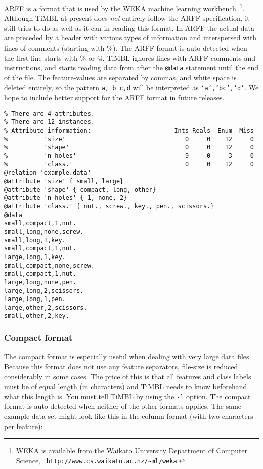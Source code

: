 \documentclass{report}
\begin{document}
ARFF is a format that is used by the WEKA machine learning
workbench~\cite{Garner95,Witten+99}\footnote{WEKA is available from
the Waikato University Department of Computer Science, {\tt
http://www.cs.waikato.ac.nz/\~{}ml/weka}.}.  Although TiMBL at present
does {\em not} entirely follow the ARFF specification, it still tries
to do as well as it can in reading this format. In ARFF the actual
data are preceded by a header with various types of information and
interspersed with lines of comments (starting with \%). The ARFF
format is auto-detected when the first line starts with \% or @. TiMBL
ignores lines with ARFF comments and instructions, and starts reading
data from after the {\tt @data} statement until the end of the
file. The feature-values are separated by commas, and white space is
deleted entirely, so the pattern {\tt a, b c,d} will be interpreted as
{\tt `a',`bc',`d'}. We hope to include better support for the ARFF format
in future releases.

\begin{footnotesize}
\begin{verbatim}
% There are 4 attributes.
% There are 12 instances.
% Attribute information:                       Ints Reals  Enum  Miss
%          'size'                                 0     0    12     0   
%          'shape'                                0     0    12     0   
%          'n_holes'                              9     0     3     0   
%          'class.'                               0     0    12     0   
@relation 'example.data'
@attribute 'size' { small, large}
@attribute 'shape' { compact, long, other}
@attribute 'n_holes' { 1, none, 2}
@attribute 'class.' { nut., screw., key., pen., scissors.}
@data
small,compact,1,nut.
small,long,none,screw.
small,long,1,key.
small,compact,1,nut.
large,long,1,key.
small,compact,none,screw.
small,compact,1,nut.
large,long,none,pen.
large,long,2,scissors.
large,long,1,pen.
large,other,2,scissors.
small,other,2,key.
\end{verbatim}
\end{footnotesize}

\subsubsection{Compact format}
\label{compactformat}

The compact format is especially useful when dealing with very large
data files. Because this format does not use any feature separators,
file-size is reduced considerably in some cases. The price of this is
that all features and class labels must be of equal length (in
characters) and TiMBL needs to know beforehand what this length
is. You must tell TiMBL by using the {\tt -l} option. The compact
format is auto-detected when neither of the other formats applies. The
same example data set might look like this in the column format (with
two characters per feature):
\end{document}
